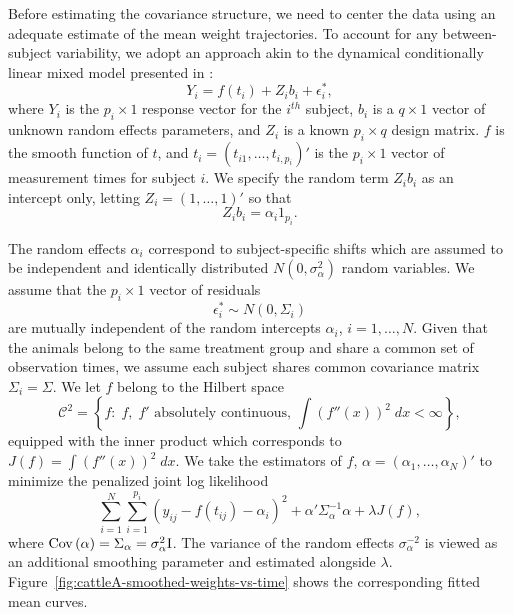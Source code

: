 Before estimating the covariance structure, we need to center the data using an adequate estimate of the mean weight trajectories. To account for any between-subject variability, we adopt an approach akin to the dynamical conditionally linear mixed model presented in \cite{pourahmadi2002dynamic}:
\begin{equation}
Y_i = f\left(t_i  \right) + Z_i b_i + \epsilon^*_i,
\end{equation} 
\noindent
where $Y_i$ is the $p_i \times 1$ response vector for the $i^{th}$ subject, $b_i$ is a $q \times 1$ vector of unknown random effects parameters, and $Z_i$ is a known $p_i \times q$ design matrix.  $f$ is the smooth function of $t$, and $t_i = \left(t_{i1}, \dots, t_{i,p_i}\right)'$ is the $p_i \times 1$ vector of measurement times for subject $i$. We specify the random term $Z_i b_i$ as an intercept only, letting $Z_i = \left(1 , \dots, 1\right)'$ so that 
\[
 Z_i b_i = \alpha_i 1_{p_i}.
\] 

\noindent
The random effects $\alpha_i$ correspond to subject-specific shifts which are assumed to be independent and identically distributed $N\left(0,\sigma_\alpha^2\right)$ random variables. We assume that the $p_i \times 1$ vector of residuals
\[
\epsilon^*_i \sim N\left(0, \Sigma_i\right)
\] 
\noindent
are mutually independent of the random intercepts $\alpha_i$, $i = 1,\dots, N$. Given that the animals belong to the same treatment group and share a common set of observation times, we assume each subject shares common covariance matrix $\Sigma_i = \Sigma$. We let $f$ belong to the Hilbert space
\[
\mathcal{C}^2 = \left\{f: \; f,\;f' \mbox{ absolutely continuous, } \int\left(f''\left(x\right)\right)^2 \;dx < \infty  \right\}, 
\]
equipped with the inner product which corresponds to $J\left(f\right) = \int \left(f''\left(x\right)\right)^2\;dx$.
\noindent
We take the estimators of $f$, $\alpha = \left(\alpha_1,\dots, \alpha_N\right)'$ to minimize the penalized joint log likelihood
\begin{equation}
\sum_{i = 1}^N \sum_{i = 1}^{p_i} \left(y_{ij} - f\left(t_{ij} \right) - \alpha_i \right)^2 + \alpha' \Sigma_\alpha^{-1} \alpha + \lambda J \left(f\right),
\end{equation}
\noindent
where $\textup{Cov}\left(\alpha\right) = \Sigma_\alpha = \sigma_\alpha^2 \mathrm{I}$. The variance of the random effects $\sigma^{-2}_\alpha$  is viewed as an additional smoothing parameter and estimated alongside $\lambda$. Figure~\ref{fig:cattleA-smoothed-weights-vs-time} shows the corresponding fitted mean curves. 

